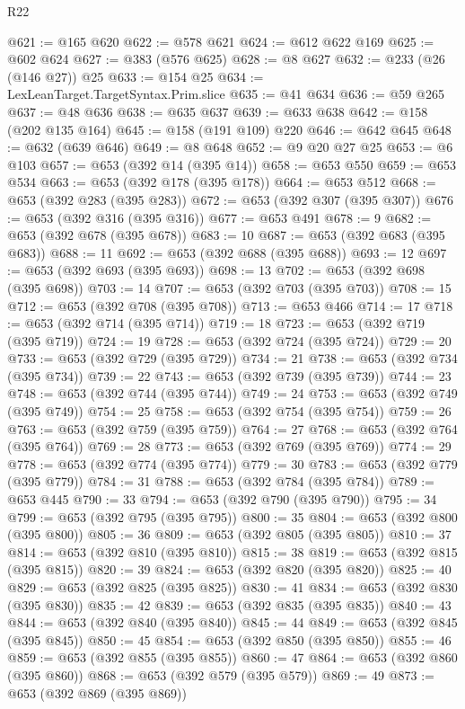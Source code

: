 \begin{lexlean}{R22}
\begin{coremodule}
@621 := @165 @620
@622 := @578 @621
@624 := @612 @622 @169
@625 := @602 @624
@627 := @383 (@576 @625)
@628 := @8 @627
@632 := @233 (@26 (@146 @27)) @25
@633 := @154 @25
@634 := LexLeanTarget.TargetSyntax.Prim.slice
@635 := @41 @634
@636 := @59 @265
@637 := @48 @636
@638 := @635 @637
@639 := @633 @638
@642 := @158 (@202 @135 @164)
@645 := @158 (@191 @109) @220
@646 := @642 @645
@648 := @632 (@639 @646)
@649 := @8 @648
@652 := @9 @20 @27 @25
@653 := @6 @103
@657 := @653 (@392 @14 (@395 @14))
@658 := @653 @550
@659 := @653 @534
@663 := @653 (@392 @178 (@395 @178))
@664 := @653 @512
@668 := @653 (@392 @283 (@395 @283))
@672 := @653 (@392 @307 (@395 @307))
@676 := @653 (@392 @316 (@395 @316))
@677 := @653 @491
@678 := 9
@682 := @653 (@392 @678 (@395 @678))
@683 := 10
@687 := @653 (@392 @683 (@395 @683))
@688 := 11
@692 := @653 (@392 @688 (@395 @688))
@693 := 12
@697 := @653 (@392 @693 (@395 @693))
@698 := 13
@702 := @653 (@392 @698 (@395 @698))
@703 := 14
@707 := @653 (@392 @703 (@395 @703))
@708 := 15
@712 := @653 (@392 @708 (@395 @708))
@713 := @653 @466
@714 := 17
@718 := @653 (@392 @714 (@395 @714))
@719 := 18
@723 := @653 (@392 @719 (@395 @719))
@724 := 19
@728 := @653 (@392 @724 (@395 @724))
@729 := 20
@733 := @653 (@392 @729 (@395 @729))
@734 := 21
@738 := @653 (@392 @734 (@395 @734))
@739 := 22
@743 := @653 (@392 @739 (@395 @739))
@744 := 23
@748 := @653 (@392 @744 (@395 @744))
@749 := 24
@753 := @653 (@392 @749 (@395 @749))
@754 := 25
@758 := @653 (@392 @754 (@395 @754))
@759 := 26
@763 := @653 (@392 @759 (@395 @759))
@764 := 27
@768 := @653 (@392 @764 (@395 @764))
@769 := 28
@773 := @653 (@392 @769 (@395 @769))
@774 := 29
@778 := @653 (@392 @774 (@395 @774))
@779 := 30
@783 := @653 (@392 @779 (@395 @779))
@784 := 31
@788 := @653 (@392 @784 (@395 @784))
@789 := @653 @445
@790 := 33
@794 := @653 (@392 @790 (@395 @790))
@795 := 34
@799 := @653 (@392 @795 (@395 @795))
@800 := 35
@804 := @653 (@392 @800 (@395 @800))
@805 := 36
@809 := @653 (@392 @805 (@395 @805))
@810 := 37
@814 := @653 (@392 @810 (@395 @810))
@815 := 38
@819 := @653 (@392 @815 (@395 @815))
@820 := 39
@824 := @653 (@392 @820 (@395 @820))
@825 := 40
@829 := @653 (@392 @825 (@395 @825))
@830 := 41
@834 := @653 (@392 @830 (@395 @830))
@835 := 42
@839 := @653 (@392 @835 (@395 @835))
@840 := 43
@844 := @653 (@392 @840 (@395 @840))
@845 := 44
@849 := @653 (@392 @845 (@395 @845))
@850 := 45
@854 := @653 (@392 @850 (@395 @850))
@855 := 46
@859 := @653 (@392 @855 (@395 @855))
@860 := 47
@864 := @653 (@392 @860 (@395 @860))
@868 := @653 (@392 @579 (@395 @579))
@869 := 49
@873 := @653 (@392 @869 (@395 @869))

\end{coremodule}
\end{lexlean}

